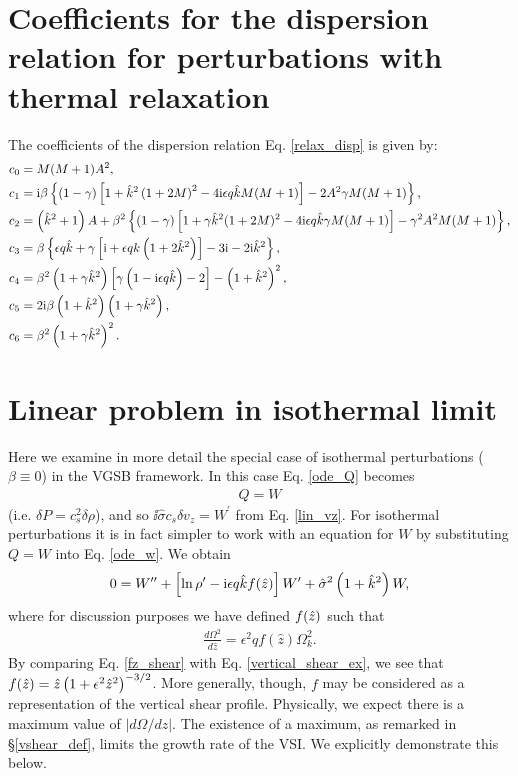 \section{Coefficients for the dispersion relation for perturbations
with thermal relaxation}\label{relax_coeff}
The coefficients of the dispersion relation Eq. \ref{relax_disp} is
given by:
\begin{align}
  &c_0 = M(M+1)A^2,\\
  &c_1 = \mathrm{i}\beta\left\{\left(1-\gamma\right)\left[1 +
      \hat{k}^2\left(1+2M\right)^2 - 4 \mathrm{i}\epsilon q\hat{k} M (M+1)\right] 
    - 2A^2\gamma M (M+1)\right\},\\
  &c_2 = \left(\hat{k}^2 + 1\right)A + \beta^2\left\{(1-\gamma)\left[1
      + \gamma \hat{k}^2(1+2M)^2 - 4\mathrm{i}\epsilon q \hat{k} \gamma M(M+1)
    \right]
    -\gamma^2 A^2 M(M+1)
  \right\},\\
  &c_3 = \beta\left\{\epsilon q \hat{k} + \gamma \left[\mathrm{i} + \epsilon q
      k \left(1+2\hat{k}^2\right)\right] - 3\mathrm{i} - 2\mathrm{i}
    \hat{k}^2\right\},\\
  &c_4 =
  \beta^2\left(1+\gamma\hat{k}^2\right)\left[\gamma\left(1-\mathrm{i}\epsilon q
    \hat{k}\right)-2\right] - \left(1+\hat{k}^2\right)^2,\\
&c_5 = 2\mathrm{i}\beta\left(1+\hat{k}^2\right)\left(1+\gamma\hat{k}^2\right),\\
&c_6 = \beta^2\left(1+\gamma\hat{k}^2\right)^2.
\end{align}

\section{Linear problem in isothermal limit}\label{iso_discuss}  
Here we examine in more detail the special case of isothermal
perturbations ($\beta\equiv 0$) in the VGSB framework.   
In this case Eq. \ref{ode_Q} becomes   
\begin{align} 
  Q = W 
\end{align}
(i.e. $\delta P = c_s^2\delta \rho$), and so $  \ii\hat{\sigma}c_s\delta v_z = W^\prime $
from Eq. \ref{lin_vz}. For isothermal perturbations it is in fact
simpler to work with an equation for $W$ by substituting $Q=W$ into
Eq. \ref{ode_w}. We obtain 
\begin{align}
  0 = W^{\prime\prime} + \left[\ln\rho^\prime - \mathrm{i} \epsilon q \hat{k}
    f(\hat{z})\right]W^\prime + \hat{\sigma}^2\left(1+\hat{k}^2\right)W,\label{iso_ode1}
\end{align}
where for discussion purposes we have defined $f(\hat{z})$ such that
\begin{align}\label{fz_shear}
  \frac{d\Omega^2}{d\hat{z}} = \epsilon^2q f(\hat{z})\Omega_k^2.
\end{align}
By comparing Eq. \ref{fz_shear} with Eq. \ref{vertical_shear_ex}, we
see that $f(\hat{z})= 
\hat{z}\left(1+\epsilon^2\hat{z}^2\right)^{-3/2}$. More generally, though,
$f$ may be considered as a representation of the vertical
shear profile. Physically, we expect there is a maximum value of 
$|d\Omega/dz|$. The existence of a maximum, as remarked in
\S\ref{vshear_def}, limits the growth rate of the VSI. We explicitly
demonstrate this below.    

